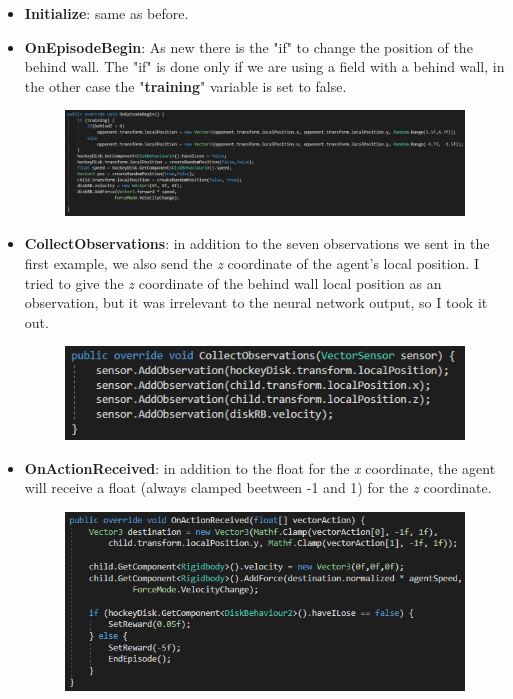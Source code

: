 \documentclass[12pt]{article}
\begin{document}
	\begin{itemize}
		\item \textbf{Initialize}: same as before.
		
		\item \textbf{OnEpisodeBegin}: As new there is the "if" to change the position of the behind wall. The "if" is done only if we are using a field with a behind wall, in the other case the "\textbf{training}" variable is set to false.
		
		\begin{figure}[hbt!]
			\centering
			\includegraphics[width= 1.25
			\textwidth]{images/OnEpisodeBegin2.png}
		\end{figure}
		
		\item \textbf{CollectObservations}: in addition to the seven observations we sent in the first example, we also send the \textit{z} coordinate of the agent's local position. I tried to give the \textit{z} coordinate of the behind wall local position as an observation, but it was irrelevant to the neural network output, so I took it out.
		
		\newpage
		
		\begin{figure}[hbt!]
			\centering
			\includegraphics[width= 1
			\textwidth]{images/CollectObservation2.png}
		\end{figure}
		
		\item \textbf{OnActionReceived}: in addition to the float for the \textit{x} coordinate, the agent will receive a float (always clamped beetween -1 and 1) for the \textit{z} coordinate. 
		
		\begin{figure}[hbt!]
			\centering
			\includegraphics[width= 1
			\textwidth]{images/OnActionReceived2.png}
		\end{figure}
		

\end{itemize}
\end{document}
